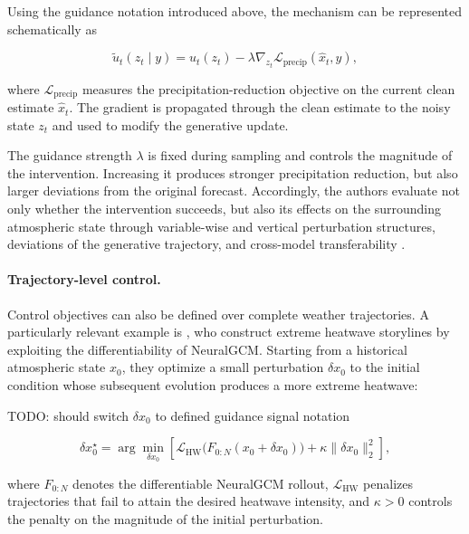 Using the guidance notation introduced above, the mechanism can be represented
schematically as

\begin{equation}
    \tilde{u}_t(z_t\mid y)
    =
    u_t(z_t)
    -
    \lambda
    \nabla_{z_t}
    \mathcal{L}_{\mathrm{precip}}(\hat{x}_t,y),
    \label{eq:ueyama-weather-guidance}
\end{equation}

where $\mathcal{L}_{\mathrm{precip}}$ measures the precipitation-reduction
objective on the current clean estimate $\hat{x}_t$. The gradient is
propagated through the clean estimate to the noisy state $z_t$ and used to
modify the generative update.

The guidance strength $\lambda$ is fixed during sampling and controls the
magnitude of the intervention. Increasing it produces stronger precipitation
reduction, but also larger deviations from the original forecast. Accordingly,
the authors evaluate not only whether the intervention succeeds, but also its
effects on the surrounding atmospheric state through variable-wise and
vertical perturbation structures, deviations of the generative trajectory,
and cross-model transferability \parencite{ueyama2026guided}.

\paragraph{Trajectory-level control.}

Control objectives can also be defined over complete weather trajectories. A
particularly relevant example is \textcite{whittaker2025heatwaves}, who
construct extreme heatwave storylines by exploiting the differentiability of
NeuralGCM. Starting from a historical atmospheric state $x_0$, they optimize a
small perturbation $\delta x_0$ to the initial condition whose subsequent
evolution produces a more extreme heatwave:

TODO: should switch $\delta x_0$ to defined guidance signal notation

\begin{equation}
    \delta x_0^\star
    =
    \arg\min_{\delta x_0}
    \left[
        \mathcal{L}_{\mathrm{HW}}
        \bigl(
            F_{0:N}(x_0+\delta x_0)
        \bigr)
        +
        \kappa
        \lVert\delta x_0\rVert_2^2
    \right],
    \label{eq:heatwave-storyline-optimization}
\end{equation}

where $F_{0:N}$ denotes the differentiable NeuralGCM rollout,
$\mathcal{L}_{\mathrm{HW}}$ penalizes trajectories that fail to attain the
desired heatwave intensity, and $\kappa>0$ controls the penalty on the
magnitude of the initial perturbation.

